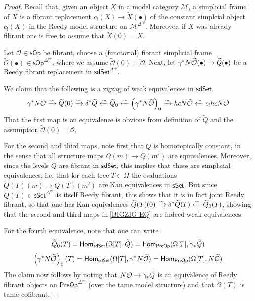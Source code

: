 \documentclass[a4paper,10pt
,draft
]{article}%
\renewcommand{\1}{\eta}%
\begin{document}
\begin{proof}
	Recall that, given an object $X$ in a model category $\mathcal{M}$, a simplicial frame of $X$ is a fibrant replacement
	$c_!(X) \to \widetilde{X}(\bullet)$ of the constant 
	simplcial object $c_!(X)$ in the Reedy model structure on $\mathcal{M}^{\Delta^{op}}$.
	Moreover, if $X$ was already fibrant one is free to assume that $\widetilde{X}(0) = X$.
	
	Let $\mathcal{O} \in \mathsf{sOp}$ be fibrant, 
	choose a (functorial) fibrant simplicial frame
	$\widetilde{\mathcal{O}}(\bullet) \in \mathsf{sOp}^{\Delta^{op}}$, where we assume $\widetilde{\mathcal{O}} (0) = \mathcal{O}$.
	Next, let 
	$\gamma^{\**} N \widetilde{\mathcal{O}}(\bullet) 
	\to \widetilde{Q}(\bullet)$
	be a Reedy fibrant replacement in  
	$\mathsf{sdSet}^{\Delta^{op}}$.
	
	We claim that the following is a zigzag of weak equivalences in $\mathsf{sdSet}$.
\begin{equation}\label{BIGZIG EQ}
	\gamma^{\**} N \mathcal{O} \xrightarrow{\sim}
	\widetilde{Q}(0) \xrightarrow{\sim}
	\delta^{\**} \widetilde{Q} \xleftarrow{\sim}
	\widetilde{Q}_0 \xleftarrow{\sim}
	\left(\gamma^{\**} N \widetilde{\mathcal{O}}\right)_0
	\xrightarrow{\sim}
	hcN \widetilde{\mathcal{O}} \xleftarrow{\sim}
	c_{!} hcN \mathcal{O}
\end{equation}
That the first map is an equivalence is obvious from definition of $\widetilde{Q}$ and the assumption $\widetilde{\mathcal{O}}(0) = \mathcal{O}$.

For the second and third maps, note first that $\widetilde{Q}$ is homotopically constant, in the sense that all structure maps $\widetilde{Q}(m) \to \widetilde{Q}(m')$
are equivalences.
Moreover, since the levels $\widetilde{Q}$ are fibrant in 
$\mathsf{sdSet}$, this implies that these are simplicial equivalences, i.e. that for each tree $T \in \Omega$
the evaluations 
$\widetilde{Q}(T)(m) \to \widetilde{Q}(T)(m')$
are Kan equivalences in $\mathsf{sSet}$.
But since $\widetilde{Q}(T) \in \mathsf{sSet}^{\Delta^{op}}$ is itself Reedy fibrant, this shows that it is in fact joint Reedy fibrant, so that one has Kan equivalences 
$\widetilde{Q}(T)(0) \xrightarrow{\sim}
\delta^{\**} \widetilde{Q}(T) \xleftarrow{\sim}
\widetilde{Q}_0(T)$, showing that the second and third maps in \eqref{BIGZIG EQ} are indeed weak equivalences.

For the fourth equivalence, note that one can write
\[\widetilde{Q}_0(T) = 
\mathsf{Hom}_{\mathsf{sdSet}}(\Omega[T],\widetilde{Q})=
\mathsf{Hom}_{\mathsf{PreOp}}(\Omega[T],\gamma_{\**}\widetilde{Q})\]
\[
\left(\gamma^{\**} N \widetilde{\mathcal{O}}\right)_0(T) = 
\mathsf{Hom}_{\mathsf{sdSet}}(\Omega[T],\gamma^{\**} N \widetilde{\mathcal{O}})=
\mathsf{Hom}_{\mathsf{PreOp}}(\Omega[T], N \widetilde{\mathcal{O}})
\]
The claim now follows by noting that
$N \mathcal{O} \to \gamma_{\**} \widetilde{Q}$
is an equivalence of Reedy fibrant objects on 
$\mathsf{PreOp}^{\Delta^{op}}$ (over the tame model structure) and that $\Omega(T)$ is tame cofibrant. 


\end{proof}
\end{document}
